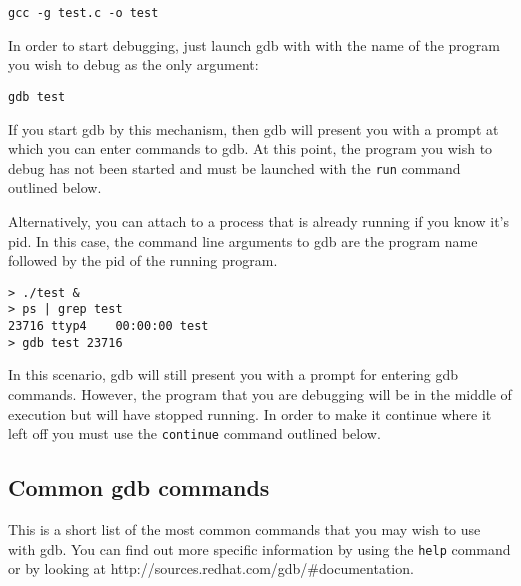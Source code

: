 \documentclass[11pt, letterpaper]{article}
\begin{document}
\begin{verbatim}
gcc -g test.c -o test
\end{verbatim}

In order to start debugging, just launch gdb with with the name of the
program you wish to debug as the only argument:

\begin{verbatim}
gdb test
\end{verbatim}

If you start gdb by this mechanism, then gdb will present you with a
prompt at which you can enter commands to gdb.  At this point, the
program you wish to debug has not been started and must be launched with
the {\tt run} command outlined below.

Alternatively, you can attach to a process that is already running if
you know it's pid.  In this case, the command line arguments to gdb are
the program name followed by the pid of the running program.

\begin{verbatim}
> ./test &
> ps | grep test
23716 ttyp4    00:00:00 test
> gdb test 23716
\end{verbatim}

In this scenario, gdb will still present you with a prompt for entering
gdb commands.  However, the program that you are debugging will be in
the middle of execution but will have stopped running.  In order to make
it continue where it left off you must use the {\tt continue} command
outlined below.

\subsection{Common gdb commands}

This is a short list of the most common commands that you may wish to use with
gdb.  You can find out more specific information by using the {\tt help}
command or by looking at http://sources.redhat.com/gdb/\#documentation.
\end{document}
